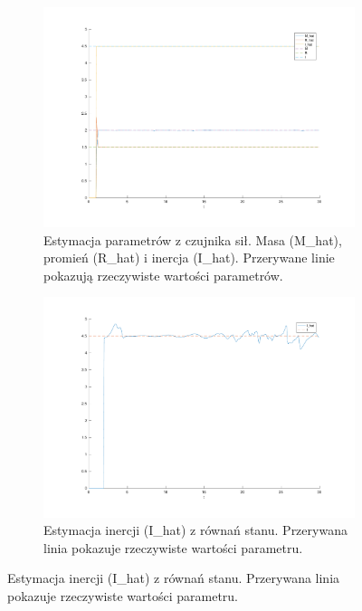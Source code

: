 \documentclass[a4paper, 10pt]{article}
\begin{document}
\begin{figure}
\begin{subfigure}{.5\textwidth}
		\includegraphics[width=\linewidth]{mrozenie_c}
		\caption{Estymacja parametrów z czujnika sił. Masa (M\_hat), promień (R\_hat) i inercja (I\_hat). Przerywane linie pokazują rzeczywiste wartości parametrów.}
		\label{fig:mrozenie_c}
	\end{subfigure}%
	\begin{subfigure}{.5\textwidth}
		\centering
		\includegraphics[width=\linewidth]{mrozenie_r}
		\caption{Estymacja inercji (I\_hat) z równań stanu. Przerywana linia pokazuje rzeczywiste wartości parametru.}
		\label{fig:mrozenie_r}
	\end{subfigure}
	

\end{figure}
\end{document}
